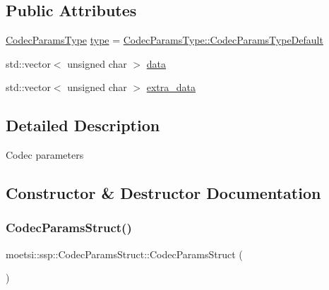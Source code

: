 \subsection*{Public Attributes}
\begin{DoxyCompactItemize}
\item 
\hyperlink{namespacemoetsi_1_1ssp_a6d638ba0bd38e9daded08f633d893563}{Codec\+Params\+Type} \hyperlink{structmoetsi_1_1ssp_1_1CodecParamsStruct_a94a427a8907bb5a23c4f6ee2117a4803}{type} = \hyperlink{namespacemoetsi_1_1ssp_a6d638ba0bd38e9daded08f633d893563a1ffd3a6c06641b95d3e5142403ed0730}{Codec\+Params\+Type\+::\+Codec\+Params\+Type\+Default}
\item 
std\+::vector$<$ unsigned char $>$ \hyperlink{structmoetsi_1_1ssp_1_1CodecParamsStruct_a23aa918989011a025ddc24a7e2e8cf70}{data}
\item 
std\+::vector$<$ unsigned char $>$ \hyperlink{structmoetsi_1_1ssp_1_1CodecParamsStruct_a709ed326f505393910eece3dc6887605}{extra\+\_\+data}
\end{DoxyCompactItemize}


\subsection{Detailed Description}
Codec parameters 

\subsection{Constructor \& Destructor Documentation}
\mbox{\label{structmoetsi_1_1ssp_1_1CodecParamsStruct_ae2d0f15ae18885a73ac37cf51c78abf4}} 
\subsubsection{\texorpdfstring{Codec\+Params\+Struct()}{CodecParamsStruct()}\hspace{0.1cm}{\footnotesize\ttfamily [1/4]}}
{\footnotesize\ttfamily moetsi\+::ssp\+::\+Codec\+Params\+Struct\+::\+Codec\+Params\+Struct (\begin{DoxyParamCaption}{ }\end{DoxyParamCaption})\hspace{0.3cm}{\ttfamily [inline]}}

